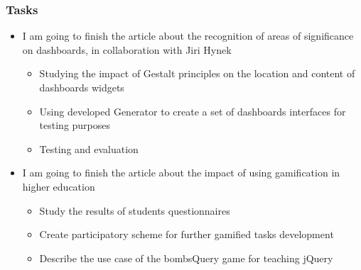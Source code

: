 \documentclass[10pt,xcolor=pdflatex]{beamer}
\begin{document}
\begin{frame}\frametitle{Tasks}

       \begin{itemize}
           \item I am going to finish the article about the recognition of areas of significance on dashboards, in collaboration with Jiri Hynek
               \begin{itemize}
                   \item Studying the impact of Gestalt principles on the location and content of dashboards widgets
                   \item Using developed Generator to create a set of dashboards interfaces for testing purposes
                   \item Testing and evaluation
               \end{itemize}
           \item I am going to finish the article about the impact of using gamification in higher education
               \begin{itemize}
                  \item Study the results of students questionnaires
                  \item Create participatory scheme for further gamified tasks development
                  \item Describe the use case of the bombsQuery game for teaching jQuery
               \end{itemize} 
       \end{itemize}
\end{frame}


\end{document}
